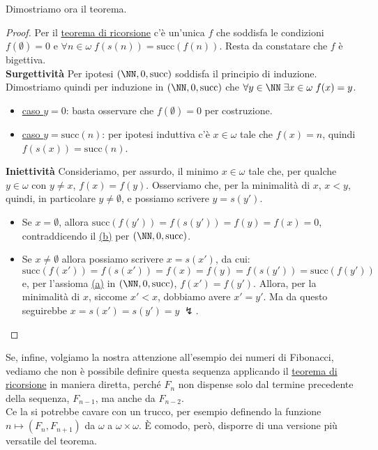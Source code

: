 \documentclass[11pt]{scrartcl}
\begin{document}
Dimostriamo ora il teorema.

\begin{proof}
	Per il \hyperref[ric1]{teorema di ricorsione} c'è un'unica $f$ che soddisfa le condizioni $f(\emptyset) = 0$ e $\forall n \in \omega \; f(s(n)) = \text{succ}(f(n))$.
	Resta da constatare che $f$ è bigettiva.\\
	\textbf{Surgettività} Per ipotesi $(\NN, 0, \text{succ})$ soddisfa il principio di induzione. Dimostriamo quindi per induzione in $(\NN, 0, \text{succ})$ che $\forall y \in \NN \; \exists x \in \omega \; f(x) = y$.
	\begin{itemize}
		\item \underline{caso $y = 0$}: basta osservare che $f(\emptyset) = 0$ per costruzione.
		\item \underline{caso $y = \text{succ}(n)$}: per ipotesi induttiva c'è $x \in \omega$ tale che $f(x) = n$, quindi $f(s(x)) = \text{succ}(n)$.
	\end{itemize}
	\textbf{Iniettività} Consideriamo, per assurdo, il minimo $x \in \omega$ tale che, per qualche $y \in \omega$ con $y \ne x$, $f(x) = f(y)$.
	Osserviamo che, per la minimalità di $x$, $x<y$, quindi, in particolare $y \ne \emptyset$, e possiamo scrivere $y = s(y')$.\\
	\begin{itemize}
		\item Se $x = \emptyset$, allora $\text{succ}(f(y')) = f(s(y')) = f(y) = f(x) = 0$, contraddicendo il \hyperref[b]{(b)} per $(\NN, 0, \text{succ})$.
		\item Se $x \ne \emptyset$ allora possiamo scrivere $x = s(x')$, da cui:
		\[ \text{succ}(f(x')) = f(s(x')) = f(x) = f(y) = f(s(y')) = \text{succ}(f(y'))
			\]
		e, per l'assioma \hyperref[a]{(a)} in $(\NN, 0, \text{succ})$, $f(x') = f(y')$. Allora, per la minimalità di $x$, siccome $x' < x$, dobbiamo avere $x' = y'$.
		Ma da questo seguirebbe $x = s(x') = s(y') = y \; \lightning$.
	\end{itemize}
\end{proof}

Se, infine, volgiamo la nostra attenzione all'esempio dei numeri di Fibonacci, vediamo che non è possibile definire questa sequenza applicando il \hyperref[ric1]{teorema di ricorsione}
in maniera diretta, perché $F_n$ non dispense solo dal termine precedente della sequenza, $F_{n-1}$, ma anche da $F_{n-2}$.\\
Ce la si potrebbe cavare con un trucco, per esempio definendo la funzione $n \longmapsto (F_n,F_{n+1})$ da $\omega$ a $\omega \times \omega$. È comodo, però, disporre di una versione più 
versatile del teorema.
\end{document}
